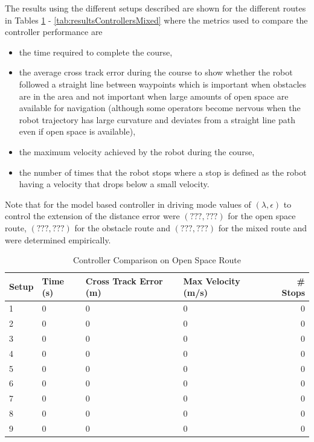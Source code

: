 The results using the different setups described are shown for the different routes in Tables \ref{tab:resultsControllersOpenSpace} - \ref{tab:resultsControllersMixed} where the metrics used to compare the controller performance are
\begin{itemize}
\item the time required to complete the course,
\item the average cross track error during the course to show whether the robot followed a straight line between waypoints which is important when obstacles are in the area and not important when large amounts of open space are available for navigation (although some operators become nervous when the robot trajectory has large curvature and deviates from a straight line path even if open space is available),
\item the maximum velocity achieved by the robot during the course,
\item the number of times that the robot stops where a stop is defined as the robot having a velocity that drops below a small velocity.
\end{itemize}
Note that for the model based controller in driving mode values of $(\lambda, \epsilon)$ to control the extension of the distance error were $(???,???)$ for the open space route, $(???,???)$ for the obstacle route and $(???,???)$ for the mixed route and were determined empirically.

\begin{table}[ht!]
\caption{Controller Comparison on Open Space Route}
\small
\centering
\begin{tabular}{@{}llllr@{}} \toprule
Setup & Time (s) & Cross Track Error (m) & Max Velocity (m/s) & \# Stops \\ \midrule
1     & 0        & 0                     & 0                  & 0        \\
2     & 0        & 0                     & 0                  & 0        \\
3     & 0        & 0                     & 0                  & 0        \\
4     & 0        & 0                     & 0                  & 0        \\
5     & 0        & 0                     & 0                  & 0        \\
6     & 0        & 0                     & 0                  & 0        \\
7     & 0        & 0                     & 0                  & 0        \\
8     & 0        & 0                     & 0                  & 0        \\
9     & 0        & 0                     & 0                  & 0        \\ \bottomrule
\end{tabular}
\label{tab:resultsControllersOpenSpace}
\end{table}

